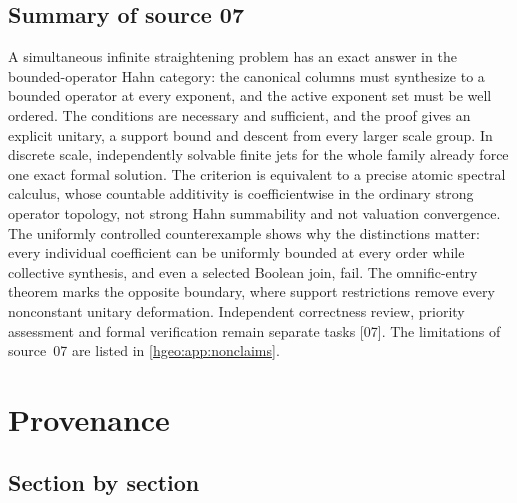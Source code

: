 \documentclass[11pt,letterpaper]{article}
\numberwithin{equation}{section}
\theoremstyle{definition}
\theoremstyle{remark}
\newcommand{\src}[1]{\textup{\textsf{\small[#1]}}}
\begin{document}
\subsection{Summary of source 07}\label{hgeo:us:sub:summary}
A simultaneous infinite straightening problem has an exact answer in the
bounded-operator Hahn category: the canonical columns must synthesize to a
bounded operator at every exponent, and the active exponent set must be well
ordered. The conditions are necessary and sufficient, and the proof gives an
explicit unitary, a support bound and descent from every larger scale group.
In discrete scale, independently solvable finite jets for the whole family
already force one exact formal solution. The criterion is equivalent to a
precise atomic spectral calculus, whose countable additivity is coefficientwise
in the ordinary strong operator topology, not strong Hahn summability and not
valuation convergence. The uniformly controlled counterexample shows why the
distinctions matter: every individual coefficient can be uniformly bounded at
every order while collective synthesis, and even a selected Boolean join,
fail. The omnific-entry theorem marks the opposite boundary, where support
restrictions remove every nonconstant unitary deformation. Independent
correctness review, priority assessment and formal verification remain
separate tasks \src{07}. The limitations of source~07 are listed in
\cref{hgeo:app:nonclaims}.

\clearpage
\appendix
\section{Provenance}\label{hgeo:app:provenance}

\subsection{Section by section}
\end{document}
